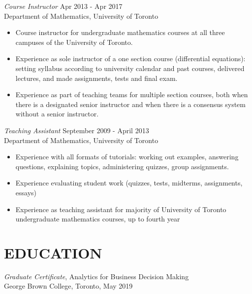 \documentclass[margin, 10pt]{res} %
\begin{document}
\begin{resume}
{\sl Course Instructor} \hfill Apr 2013 - Apr 2017 \\
Department of Mathematics, University of Toronto

\begin{itemize} \itemsep -2pt %
\item Course instructor for undergraduate mathematics courses at all three campuses of the University of Toronto.

\item Experience as sole instructor of a one section course (differential equations): setting syllabus according to university calendar and past courses, delivered lectures, and made assignments, tests and final exam.

\item Experience as part of teaching teams for multiple section courses, both when there is a designated senior instructor and when there is a consensus system without a senior instructor.

\end{itemize}
 
{\sl Teaching Assistant} \hfill September 2009 - April 2013 \\
Department of Mathematics, University of Toronto

\begin{itemize} 
\item Experience with all formats of tutorials: working out examples, answering questions, explaining topics, administering quizzes, group assignments.
\item Experience evaluating student work (quizzes, tests, midterms, assignments, essays)
\item Experience as teaching assistant for majority of University of Toronto undergraduate mathematics courses, up to fourth year
\end{itemize} 


\section{EDUCATION}

{\sl Graduate Certificate}, Analytics for Business Decision Making \\
George Brown College, Toronto, May 2019


\end{resume}
\end{document}
